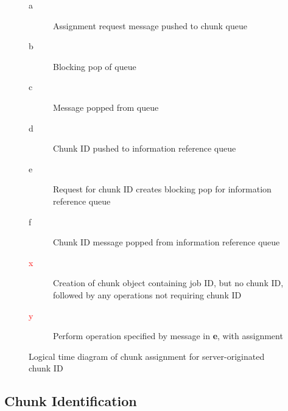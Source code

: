 \begin{figure}
	\begin{minipage}{0.4\textwidth}
	\end{minipage}
	\begin{minipage}{0.6\textwidth}
		\begin{description}
			\item [a] Assignment request message pushed to chunk
				queue
			\item [b] Blocking pop of queue
			\item [c] Message popped from queue
			\item [d] Chunk ID pushed to information reference
				queue
			\item [e] Request for chunk ID creates blocking pop for
				information reference queue
			\item [f] Chunk ID message popped from information
				reference queue
			\item [\textcolor{red}{x}] Creation of chunk object
				containing job ID, but no chunk ID, followed by
				any operations not requiring chunk ID
			\item [\textcolor{red}{y}] Perform operation specified
				by message in \textbf{e}, with assignment
		\end{description}
	\end{minipage}
	\caption{\label{fig:w-o-td}Logical time diagram of chunk assignment for
	server-originated chunk ID}
\end{figure}

\subsection{Chunk Identification}

